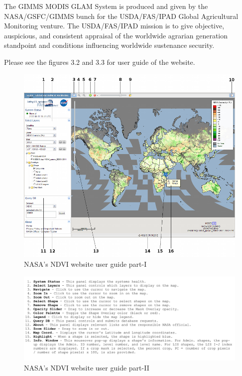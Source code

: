 The GIMMS MODIS GLAM System is produced and given by the NASA/GSFC/GIMMS bunch for the USDA/FAS/IPAD Global Agricultural Monitoring venture. The USDA/FAS/IPAD mission is to give objective, auspicious, and consistent appraisal of the worldwide agrarian generation standpoint and conditions influencing worldwide sustenance security.

Please see the figures 3.2 and 3.3 for user guide of the website.

    \begin{figure}[H]
            \centering
            \includegraphics[width=1.0\linewidth]{figures/ch3/nasa_website_1.png}
            \caption{\label{fig:nasa_website_1} NASA's NDVI website user guide part-I}
    \end{figure}
    
    
    \begin{figure}[H]
            \centering
            \includegraphics[width=1.0\linewidth]{figures/ch3/nasa_website_2.png}
            \caption{\label{fig:nasa_website_2} NASA's NDVI website user guide part-II}
    \end{figure}    


